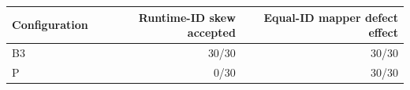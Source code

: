\begin{tabular}{lrr}
\toprule
Configuration & Runtime-ID skew accepted & Equal-ID mapper defect effect \\
\midrule
B3 & 30/30 & 30/30 \\
P & 0/30 & 30/30 \\
\bottomrule
\end{tabular}
